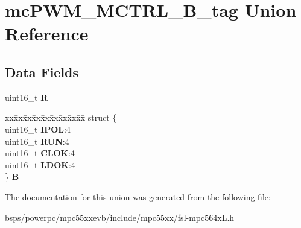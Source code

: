 \hypertarget{unionmcPWM__MCTRL__16B__tag}{}\section{mc\+P\+W\+M\+\_\+\+M\+C\+T\+R\+L\+\_\+B\+\_\+tag Union Reference}
\label{unionmcPWM__MCTRL__16B__tag}
\subsection*{Data Fields}
\begin{DoxyCompactItemize}
\item 
\mbox{\label{unionmcPWM__MCTRL__16B__tag_ab0ac64ae34c4137be39efb4efa2b47b0}} 
uint16\+\_\+t {\bfseries R}
\item 
\mbox{\label{unionmcPWM__MCTRL__16B__tag_aab0ebd29aa1638527a2e3590045d7e0f}} 
\begin{tabbing}
xx\=xx\=xx\=xx\=xx\=xx\=xx\=xx\=xx\=\kill
struct \{\\
\>uint16\_t {\bfseries IPOL}:4\\
\>uint16\_t {\bfseries RUN}:4\\
\>uint16\_t {\bfseries CLOK}:4\\
\>uint16\_t {\bfseries LDOK}:4\\
\} {\bfseries B}\\

\end{tabbing}\end{DoxyCompactItemize}


The documentation for this union was generated from the following file\+:\begin{DoxyCompactItemize}
\item 
bsps/powerpc/mpc55xxevb/include/mpc55xx/fsl-\/mpc564x\+L.\+h\end{DoxyCompactItemize}
